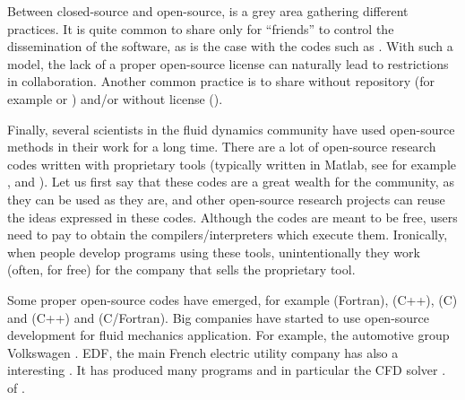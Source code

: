 Between closed-source and open-source, is a grey area gathering different
practices.
%
It is quite common to share only for ``friends'' to control the dissemination
of the software, as is the case with the codes such as
.
%
%
With such a model, the lack of a proper open-source license can naturally lead
to restrictions in collaboration.
%
Another common practice is to share without repository (for example
 or
) and/or
without license ().

Finally, several scientists in the fluid dynamics community have used
open-source methods in their work for a long time.
%
There are a lot of open-source research codes written with proprietary tools
(typically written in Matlab, see for example
,
 and
).
%
Let us first say that these codes are a great wealth for the community, as they
can be used as they are, and other open-source research projects can reuse
the ideas expressed in these codes.
%
Although the codes are meant to be free, users need to pay to obtain the
compilers/interpreters which execute them.
%
Ironically, when people develop programs using these tools, unintentionally
they work (often, for free) for the company that sells the proprietary tool.

Some proper open-source codes have emerged, for example
 (Fortran),
 (C++),
 (C) and
 (C++) and
 (C/Fortran).
%
Big companies have started to use open-source development for fluid mechanics
application. For example, the automotive group Volkswagen .
%
EDF, the main French electric utility company has also a interesting
. It has produced many programs and in particular the CFD
solver .
%
 of .

